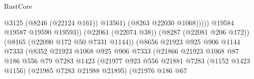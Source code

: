 \begin{lexlean}{RustCore}
\begin{coremodule}
                                                              @3125
                                                              (@8246 (@22124 @161))
                                                              @13561)
                                                            (@8263 @22030 @1068)))))
                                                    @19584
                                                    @19587
                                                    @19590
                                                    @19593))
                                                (@22061 (@22074 @38))
                                                (@8287 (@22081 @206 @172))
                                                (@8165 (@22090 @172 @50 @7331 @1144))
                                                (@8656
                                                  @21923
                                                  @925
                                                  @906
                                                  @1144
                                                  @7333
                                                  (@8352
                                                    @21923
                                                    @1068
                                                    @925
                                                    @906
                                                    @7333
                                                    (@21866
                                                      @21923
                                                      @1068
                                                      @87
                                                      @186
                                                      @556
                                                      @79
                                                      @7283
                                                      @1423
                                                      (@21977
                                                        @923
                                                        @556
                                                        @21881
                                                        @7283
                                                        (@1152 @1423 @1156)
                                                        (@21985 @7283 @21988 @21895)
                                                        (@21976
                                                          @186
                                                          @67

\end{coremodule}
\end{lexlean}
